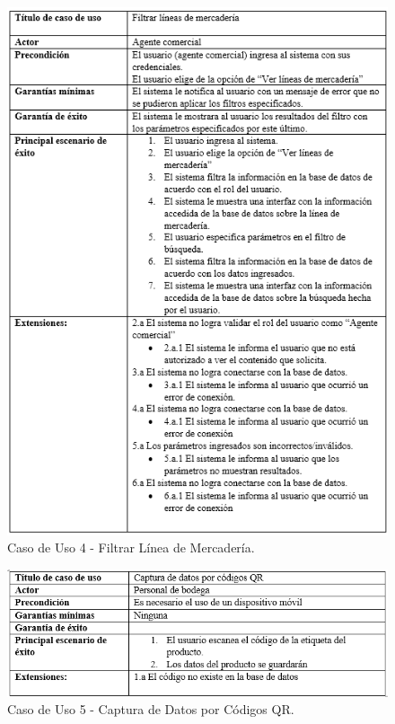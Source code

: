 \documentclass{scrreprt}
\begin{document}
\begin{figure}[!htpb]
    \centerline{\includegraphics[scale=.75]{images/case_stiff/stuff34.png}}
    \caption{Caso de Uso 4 - Filtrar Línea de Mercadería.}
    \label{fig}
\end{figure}
\FloatBarrier

\begin{figure}[!htpb]
    \centerline{\includegraphics[scale=.75]{images/case_stiff/stuff5.png}}
    \caption{Caso de Uso 5 - Captura de Datos por Códigos QR.}
    \label{fig}
\end{figure}
\FloatBarrier
\end{document}
